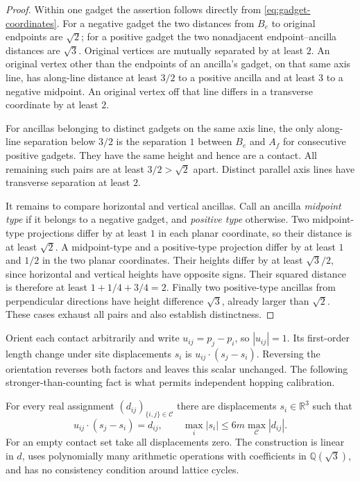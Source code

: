 \begin{proof}
Within one gadget the assertion follows directly from
\eqref{eq:gadget-coordinates}.  For a negative gadget the two distances
from $B_e$ to original endpoints are $\sqrt2$; for a positive gadget
the two nonadjacent endpoint--ancilla distances are $\sqrt3$.
Original vertices are mutually separated by at least $2$.
An original vertex other than the endpoints of an ancilla's gadget,
on that same axis line, has along-line distance at least $3/2$ to a
positive ancilla and at least $3$ to a negative midpoint.
An original vertex off that line differs in a transverse coordinate
by at least $2$.

For ancillas belonging to distinct gadgets on the same axis line,
the only along-line separation below $3/2$ is the separation $1$
between $B_e$ and $A_f$ for consecutive positive gadgets.  They have
the same height and hence are a contact.  All remaining such pairs
are at least $3/2>\sqrt2$ apart.  Distinct parallel axis lines have
transverse separation at least $2$.

It remains to compare horizontal and vertical ancillas.  Call an
ancilla \emph{midpoint type} if it belongs to a negative gadget,
and \emph{positive type} otherwise.  Two midpoint-type projections
differ by at least $1$ in each planar coordinate, so their distance
is at least $\sqrt2$.  A midpoint-type and a positive-type projection
differ by at least $1$ and $1/2$ in the two planar coordinates.
Their heights differ by at least $\sqrt3/2$, since horizontal and
vertical heights have opposite signs.  Their squared distance is
therefore at least $1+1/4+3/4=2$.  Finally two positive-type ancillas
from perpendicular directions have height difference $\sqrt3$,
already larger than $\sqrt2$.  These cases exhaust all pairs and
also establish distinctness.
\end{proof}

Orient each contact arbitrarily and write
$u_{ij}=p_j-p_i$, so $|u_{ij}|=1$.  Its first-order length change under
site displacements $s_i$ is $u_{ij}\cdot(s_j-s_i)$.  Reversing the
orientation reverses both factors and leaves this scalar unchanged.
The following stronger-than-counting fact is what permits independent
hopping calibration.

\begin{lemma}
\label{lem:displacement}
For every real assignment $(d_{ij})_{\{i,j\}\in\mathcal C}$ there
are displacements $s_i\in\mathbb R^3$ such that
\begin{equation}\label{eq:contact-displacement}
 u_{ij}\cdot(s_j-s_i)=d_{ij},\qquad
 \max_i|s_i|\leq6m\max_{\mathcal C}|d_{ij}|.
\end{equation}
For an empty contact set take all displacements zero.  The construction
is linear in $d$, uses polynomially many arithmetic operations with
coefficients in $\mathbb Q(\sqrt3)$, and has no consistency condition
around lattice cycles.
\end{lemma}

